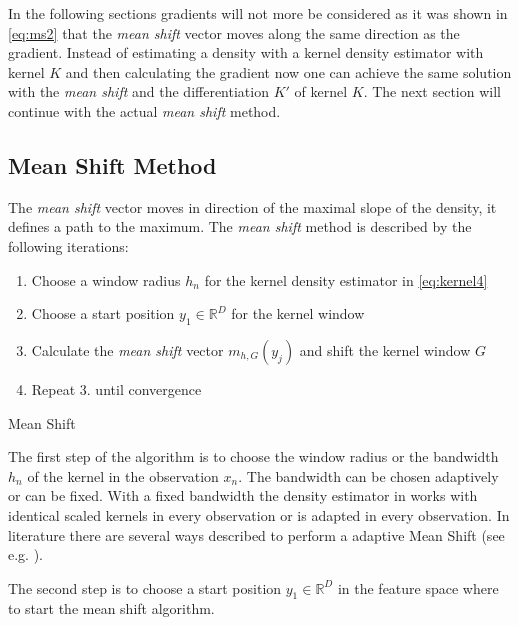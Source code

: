 In the following sections gradients will not more be considered as it was shown
in \autoref{eq:ms2} that the \emph{mean shift} vector moves along the same
direction as the gradient. Instead of estimating a density with a kernel 
density estimator with kernel $K$ and then calculating the gradient now one can
achieve the same solution with the \emph{mean shift} and the differentiation
$K'$ of kernel $K$. The next section will continue with the actual \emph{mean shift}
method.

\subsection{Mean Shift Method} 
\label{sec:mean_shift_method}

The \emph{mean shift} vector moves in direction of the maximal slope of the
density, it defines a path to the maximum. The \emph{mean shift}
method is described by the following iterations:

\begin{algorithm2e}[H]

\begin{enumerate}%
	\item Choose a window radius $h_n$ for the kernel density estimator in \autoref{eq:kernel4}
  	\item Choose a start position $y_1 \in \mathbb{R}^D$ for the kernel window
   	\item Calculate the \emph{mean shift} vector $m_{h,G}(y_j)$ and shift the kernel window $G$
	\item Repeat 3. until convergence
\end{enumerate}

\caption{Mean Shift}
\label{alg:ms}
\end{algorithm2e}

The first step of the algorithm is to choose the window radius or the bandwidth
$h_n$ of the kernel in the observation $x_n$. The bandwidth can be chosen 
adaptively or can be fixed. With a fixed bandwidth the density estimator in \label{eq:kernel4} 
works with identical scaled kernels in every observation or is adapted in every
observation. In literature there are several ways described to perform a
adaptive Mean Shift (see e.g. \citeauthor{citeulike:4910570}
\citep{citeulike:4910570}). 

The second step is to choose a start position $y_1 \in \mathbb{R}^D$ in the 
feature space where to start the mean shift algorithm.

